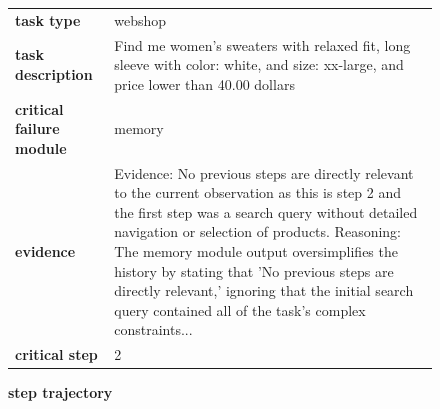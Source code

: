 \documentclass[../../main.tex]{subfiles}
\begin{document}
\begin{figure}[htbp]
\centering

\begin{tcolorbox}[
    title=\textbf{Error Type - Over Simplification},
    colback=orange!1!white,
    colframe=orange!50!black,
    fonttitle=\bfseries,
    enhanced jigsaw,
    breakable
]
\small

\begin{tabularx}{\linewidth}{@{}lX@{}}
\textbf{task type} & webshop \\
\textbf{task description} & Find me women's sweaters with relaxed fit, long sleeve with color: white, and size: xx-large, and price lower than 40.00 dollars \\
\textbf{critical failure module} & memory \\
\textbf{evidence} & Evidence: No previous steps are directly relevant to the current observation as this is step 2 and the first step was a search query without detailed navigation or selection of products. Reasoning: The memory module output oversimplifies the history by stating that 'No previous steps are directly relevant,' ignoring that the initial search query contained all of the task's complex constraints... \\
\textbf{critical step} & 2 \\
\end{tabularx}

\medskip
\textbf{step trajectory}


\end{tcolorbox}
\end{figure}
\end{document}
